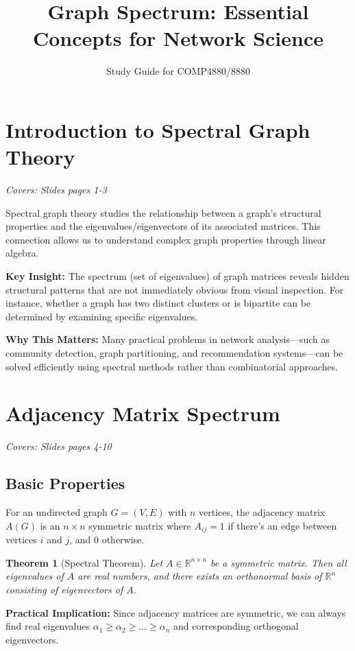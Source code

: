 \documentclass[11pt]{article}
\title{Graph Spectrum: Essential Concepts for Network Science}
\author{Study Guide for COMP4880/8880}
\date{}
\newtheorem{theorem}{Theorem}
\begin{document}
\maketitle

\section{Introduction to Spectral Graph Theory}
\textit{Covers: Slides pages 1-3}

Spectral graph theory studies the relationship between a graph's structural properties and the eigenvalues/eigenvectors of its associated matrices. This connection allows us to understand complex graph properties through linear algebra.

\textbf{Key Insight:} The spectrum (set of eigenvalues) of graph matrices reveals hidden structural patterns that are not immediately obvious from visual inspection. For instance, whether a graph has two distinct clusters or is bipartite can be determined by examining specific eigenvalues.

\textbf{Why This Matters:} Many practical problems in network analysis—such as community detection, graph partitioning, and recommendation systems—can be solved efficiently using spectral methods rather than combinatorial approaches.

\section{Adjacency Matrix Spectrum}
\textit{Covers: Slides pages 4-10}

\subsection{Basic Properties}
For an undirected graph $G = (V,E)$ with $n$ vertices, the adjacency matrix $A(G)$ is an $n \times n$ symmetric matrix where $A_{ij} = 1$ if there's an edge between vertices $i$ and $j$, and $0$ otherwise.

\begin{theorem}[Spectral Theorem]
Let $A \in \mathbb{R}^{n \times n}$ be a symmetric matrix. Then all eigenvalues of $A$ are real numbers, and there exists an orthonormal basis of $\mathbb{R}^n$ consisting of eigenvectors of $A$.
\end{theorem}

\textbf{Practical Implication:} Since adjacency matrices are symmetric, we can always find real eigenvalues $\alpha_1 \geq \alpha_2 \geq \ldots \geq \alpha_n$ and corresponding orthogonal eigenvectors.
\end{document}
